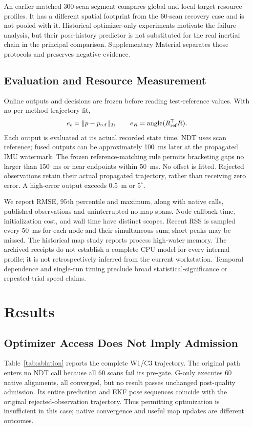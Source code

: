 \documentclass[journal,10pt,letterpaper]{IEEEtran}
\begin{document}
An earlier matched 300-scan segment compares global and local target resource profiles. It has a different spatial footprint from the 60-scan recovery case and is not pooled with it. Historical optimizer-only experiments motivate the failure analysis, but their pose-history predictor is not substituted for the real inertial chain in the principal comparison. Supplementary Material separates those protocols and preserves negative evidence.

\subsection{Evaluation and Resource Measurement}
Online outputs and decisions are frozen before reading test-reference values. With no per-method trajectory fit,
\begin{equation}
 e_t=\|p- p_{\rm ref}\|_2,\qquad
 e_R=\operatorname{angle}(R_{\rm ref}^{\mathsf T}R).
 \label{eq:errors}
\end{equation}
Each output is evaluated at its actual recorded state time. NDT uses scan reference; fused outputs can be approximately 100~ms later at the propagated IMU watermark. The frozen reference-matching rule permits bracketing gaps no larger than 150~ms or near endpoints within 50~ms. No offset is fitted. Rejected observations retain their actual propagated trajectory, rather than receiving zero error. A high-error output exceeds 0.5~m or $5^\circ$.

We report RMSE, 95th percentile and maximum, along with native calls, published observations and uninterrupted no-map spans. Node-callback time, initialization cost, and wall time have distinct scopes. Recent RSS is sampled every 50~ms for each node and their simultaneous sum; short peaks may be missed. The historical map study reports process high-water memory. The archived receipts do not establish a complete CPU model for every internal profile; it is not retrospectively inferred from the current workstation. Temporal dependence and single-run timing preclude broad statistical-significance or repeated-trial speed claims.

\section{Results}
\subsection{Optimizer Access Does Not Imply Admission}
Table~\ref{tab:ablation} reports the complete W1/C3 trajectory. The original path enters no NDT call because all 60 scans fail its pre-gate. G-only executes 60 native alignments, all converged, but no result passes unchanged post-quality admission. Its entire prediction and EKF pose sequences coincide with the original rejected-observation trajectory. Thus permitting optimization is insufficient in this case; native convergence and useful map updates are different outcomes.
\end{document}
